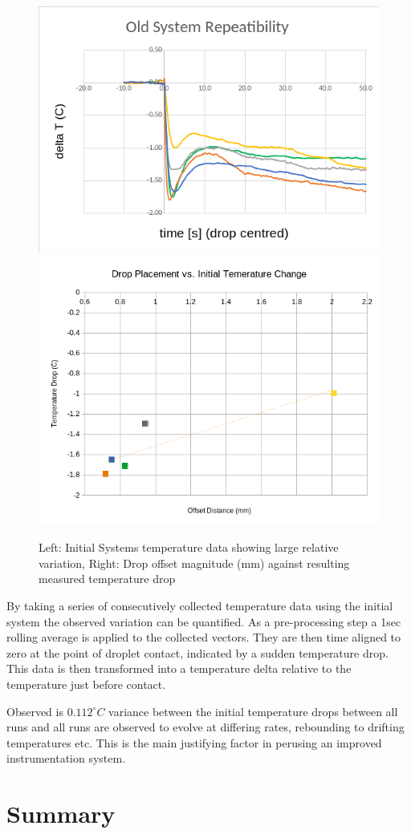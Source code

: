 \begin{figure}[h]
    \centering
    \includegraphics[width=.4\textwidth]{img/drop_temps_2018.png}
    \includegraphics[width=.4\textwidth]{img/2018_pos_temp_trend.png}
    \caption{Left: Initial Systems temperature data showing large relative variation, Right: Drop offset magnitude (mm) against resulting measured temperature drop}
\end{figure}

By taking a series of consecutively collected temperature data using the initial system the observed variation can be quantified. As a pre-processing step a 1sec rolling average is applied to the collected vectors. They are then time aligned to zero at the point of droplet contact, indicated by a sudden temperature drop. This data is then transformed into a temperature delta relative to the temperature just before contact. 

Observed is $0.112^\circ C$ variance between the initial temperature drops between all runs and all runs are observed to evolve at differing rates, rebounding to drifting temperatures etc. This is the main justifying factor in perusing an improved instrumentation system.   

\newpage
\section{Summary}

